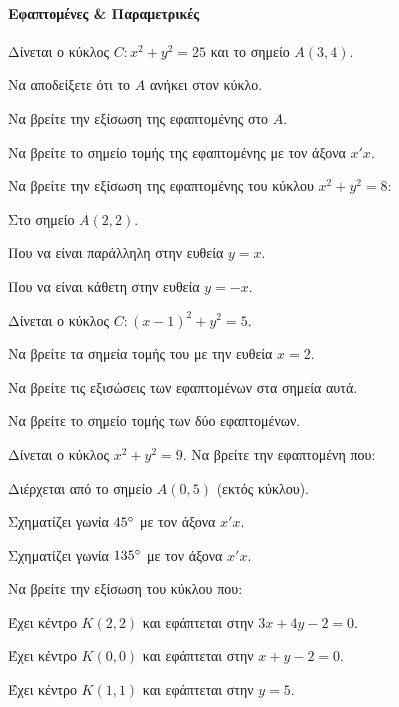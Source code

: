 \documentclass[11pt,a4paper,modern]{FFExercises}
\begin{document}
\paragraph{Εφαπτομένες \& Παραμετρικές}

\askhsh
Δίνεται ο κύκλος $C: x^2 + y^2 = 25$ και το σημείο $A(3,4)$.
\begin{alist}
    \item Να αποδείξετε ότι το $A$ ανήκει στον κύκλο.
    \item Να βρείτε την εξίσωση της εφαπτομένης στο $A$.
    \item Να βρείτε το σημείο τομής της εφαπτομένης με τον άξονα $x'x$.
\end{alist}

\askhsh
Να βρείτε την εξίσωση της εφαπτομένης του κύκλου $x^2+y^2=8$:
\begin{alist}
    \item Στο σημείο $A(2,2)$.
    \item Που να είναι παράλληλη στην ευθεία $y=x$.
    \item Που να είναι κάθετη στην ευθεία $y=-x$.
\end{alist}

\askhsh
Δίνεται ο κύκλος $C: (x-1)^2 + y^2 = 5$.
\begin{alist}
    \item Να βρείτε τα σημεία τομής του με την ευθεία $x=2$.
    \item Να βρείτε τις εξισώσεις των εφαπτομένων στα σημεία αυτά.
    \item Να βρείτε το σημείο τομής των δύο εφαπτομένων.
\end{alist}

\askhsh
Δίνεται ο κύκλος $x^2 + y^2 = 9$. Να βρείτε την εφαπτομένη που:
\begin{alist}
    \item Διέρχεται από το σημείο $A(0,5)$ (εκτός κύκλου).
    \item Σχηματίζει γωνία $45\degree$ με τον άξονα $x'x$.
    \item Σχηματίζει γωνία $135\degree$ με τον άξονα $x'x$.
\end{alist}

\askhsh
Να βρείτε την εξίσωση του κύκλου που:
\begin{alist}
    \item Έχει κέντρο $K(2,2)$ και εφάπτεται στην $3x+4y-2=0$.
    \item Έχει κέντρο $K(0,0)$ και εφάπτεται στην $x+y-2=0$.
    \item Έχει κέντρο $K(1,1)$ και εφάπτεται στην $y=5$.
\end{alist}
\end{document}
